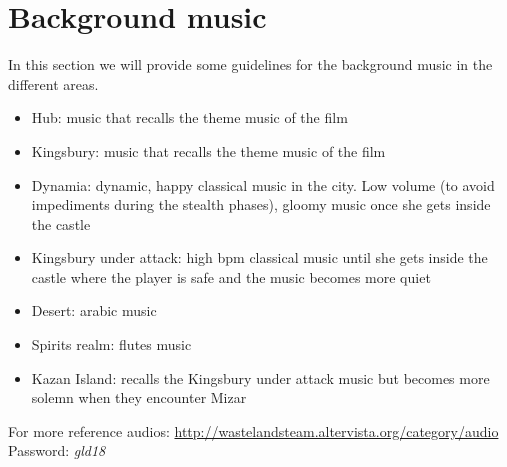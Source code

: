 \section{Background music}
In this section we will provide some guidelines for the background music in the different areas.
\begin{itemize}
\item{Hub:} music that recalls the theme music of  the film
\item{Kingsbury:} music that recalls the theme music of  the film
\item{Dynamia:} dynamic, happy classical music in the city. Low volume (to avoid impediments during the stealth phases), gloomy music once she gets inside the castle
\item{Kingsbury under attack:} high bpm classical music until she gets inside the castle where the player is safe and the music becomes more quiet
\item{Desert:} arabic music
\item{Spirits realm:} flutes music
\item{Kazan Island:} recalls the Kingsbury under attack music but becomes more solemn when they encounter Mizar
\end{itemize}

For more reference audios: \url{http://wastelandsteam.altervista.org/category/audio}\\
Password: \textit{gld18}
